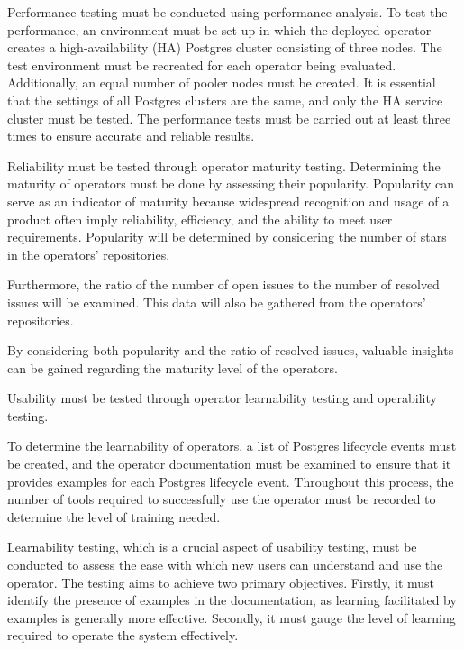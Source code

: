 Performance testing must be conducted using performance analysis. To test the performance, an environment must be set up in which the deployed operator creates a high-availability (HA) Postgres cluster consisting of three nodes.
The test environment must be recreated for each operator being evaluated. Additionally, an equal number of pooler nodes must be created. It is essential that the settings of all Postgres clusters are the same, and only the HA service cluster must be tested.
The performance tests must be carried out at least three times to ensure accurate and reliable results.

Reliability must be tested through operator maturity testing.
Determining the maturity of operators must be done by assessing their popularity. Popularity can serve as an indicator of maturity because widespread recognition and usage of a product often imply reliability, efficiency, and the ability to meet user requirements. Popularity will be determined by considering the number of stars in the operators' repositories.

Furthermore, the ratio of the number of open issues to the number of resolved issues will be examined. This data will also be gathered from the operators' repositories.

By considering both popularity and the ratio of resolved issues, valuable insights can be gained regarding the maturity level of the operators.

Usability must be tested through operator learnability testing and operability testing.

To determine the learnability of operators, a list of Postgres lifecycle events must be created, and the operator documentation must be examined to ensure that it provides examples for each Postgres lifecycle event. Throughout this process, the number of tools required to successfully use the operator must be recorded to determine the level of training needed.

Learnability testing, which is a crucial aspect of usability testing, must be conducted to assess the ease with which new users can understand and use the operator. The testing aims to achieve two primary objectives. Firstly, it must identify the presence of examples in the documentation, as learning facilitated by examples is generally more effective. Secondly, it must gauge the level of learning required to operate the system effectively.


